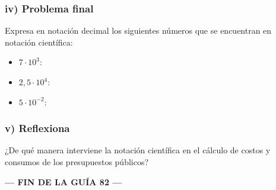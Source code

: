 \documentclass[12pt,a4paper]{article}
\begin{document}
\vspace{1cm}

\subsubsection*{iv) Problema final}

Expresa en notación decimal los siguientes números que se encuentran en notación científica:

\begin{itemize}
\item $7 \cdot 10^3$: \underline{\hspace{4cm}}
\item $2,5 \cdot 10^4$: \underline{\hspace{4cm}}
\item $5 \cdot 10^{-2}$: \underline{\hspace{4cm}}
\end{itemize}

\vspace{1cm}

\subsubsection*{v) Reflexiona}

¿De qué manera interviene la notación científica en el cálculo de costos y consumos de los presupuestos públicos?

\vspace{2cm}

\begin{center}
\textbf{--- FIN DE LA GUÍA 82 ---}
\end{center}
\end{document}
